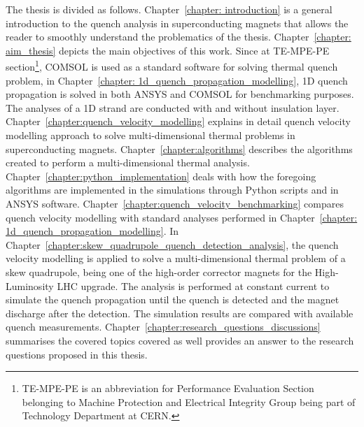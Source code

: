 
The thesis is divided as follows. Chapter~\ref{chapter: introduction} is a general introduction to the quench analysis in superconducting magnets that allows the reader to smoothly understand the problematics of the thesis. Chapter~\ref{chapter: aim_thesis} depicts the main objectives of this work. Since at TE-MPE-PE section\footnote{TE-MPE-PE is an abbreviation for Performance Evaluation Section belonging to Machine Protection and Electrical Integrity Group being part of Technology Department at CERN.}, COMSOL is used as a standard software for solving thermal quench problem, in Chapter~\ref{chapter: 1d_quench_propagation_modelling}, 1D quench propagation is solved in both ANSYS and COMSOL for benchmarking purposes. The analyses of a 1D strand are conducted with and without insulation layer. Chapter~\ref{chapter:quench_velocity_modelling} explains in detail quench velocity modelling approach to solve multi-dimensional thermal problems in superconducting magnets.
Chapter~\ref{chapter:algorithms} describes the algorithms created to perform a multi-dimensional thermal analysis. Chapter~\ref{chapter:python_implementation} deals with how the foregoing algorithms are implemented in the simulations through Python scripts and in ANSYS software. Chapter~\ref{chapter:quench_velocity_benchmarking} compares quench velocity modelling with standard analyses performed in Chapter~\ref{chapter: 1d_quench_propagation_modelling}. In Chapter~\ref{chapter:skew_quadrupole_quench_detection_analysis}, the quench velocity modelling is applied to solve a multi-dimensional thermal problem of a skew quadrupole, being one of the high-order corrector magnets for the High-Luminosity LHC upgrade. The analysis is performed at constant current to simulate the quench propagation until the quench is detected and the magnet discharge after the detection. The simulation results are compared with available quench measurements. Chapter~\ref{chapter:research_questions_discussions} summarises the covered topics covered as well provides an answer to the research questions proposed in this thesis.

